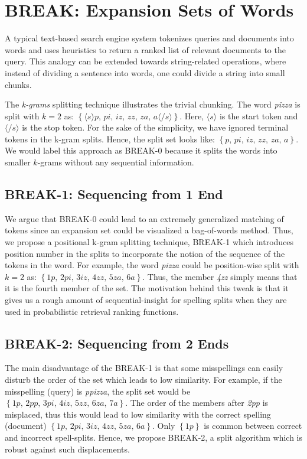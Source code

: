 

%
\chapter{BREAK: Expansion Sets of Words} %
%
\label{ch:expand} %
%
A typical text-based search engine system tokenizes queries and documents into words and uses heuristics to return a ranked list of relevant documents to the query.
This analogy can be extended towards string-related operations, where instead of dividing a sentence into words, one could divide a string into small chunks.

The \textit{k-grams} splitting technique illustrates the trivial chunking.
The word \textit{pizza} is split with $k = 2$ as: $\left\lbrace \langle \textit{s} \rangle \textit{p, pi, iz, zz, za, a} \langle / \textit{s} \rangle \right\rbrace$. 
Here, $\langle \textit{s} \rangle$ is the start token and $\langle / \textit{s} \rangle$ is the stop token.
For the sake of the simplicity, we have ignored terminal tokens in the k-gram splits.
Hence, the split set looks like: $\left\lbrace \textit{p, pi, iz, zz, za, a} \right\rbrace$. 
We would label this approach as BREAK-0 because it splits the words into smaller $k$-grams without any sequential information.

\section{BREAK-1: Sequencing from 1 End}
We argue that BREAK-0 could lead to an extremely generalized matching of tokens since an expansion set could be visualized a bag-of-words method. 
Thus, we propose a positional k-gram splitting technique, BREAK-1 which introduces position number in the splits to incorporate the notion of the sequence of the tokens in the word. 
For example, the word \textit{pizza} could be position-wise split with $k = 2$ as: $\left\lbrace \textit{1p, 2pi, 3iz, 4zz, 5za, 6a} \right\rbrace$. 
Thus, the member \textit{4zz} simply means that it is the fourth member of the set.
The motivation behind this tweak is that it gives us a rough amount of sequential-insight for spelling splits when they are used in probabilistic retrieval ranking functions.

\section{BREAK-2: Sequencing from 2 Ends}
The main disadvantage of the BREAK-1 is that some misspellings can easily disturb the order of the set which leads to low similarity.
For example, if the misspelling (query) is \textit{ppizza}, the split set would be $\left\lbrace \textit{1p, 2pp, 3pi, 4iz, 5zz, 6za, 7a} \right\rbrace$.
The order of the members after \textit{2pp} is misplaced, thus this would lead to low similarity with the correct spelling (document) $\left\lbrace \textit{1p, 2pi, 3iz, 4zz, 5za, 6a} \right\rbrace$. 
Only $\left\lbrace \textit{1p} \right\rbrace$ is common between correct and incorrect spell-splits.
Hence, we propose BREAK-2, a split algorithm which is robust against such displacements.

